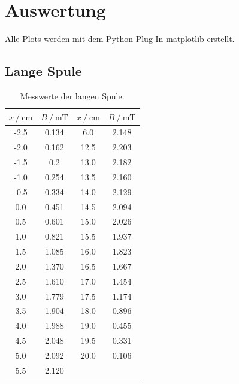 \section{Auswertung}
\label{sec:Auswertung}
Alle Plots werden mit dem Python Plug-In matplotlib \cite{matplotlib} erstellt.
\subsection{Lange Spule}

\FloatBarrier

\begin{table}
\centering
\caption{Messwerte der langen Spule.}
\begin{tabular}{cc|cc}
  \toprule
  $x \:/\: \si{\centi\meter}$ & $B \:/\: \si{\milli\tesla}$ & $x \:/\: \si{\centi\meter}$ & $B \:/\: \si{\milli\tesla}$ \\
  \midrule
  -2.5 & 0.134 &  6.0 & 2.148  \\
  -2.0 & 0.162 & 12.5 & 2.203 \\
  -1.5 & 0.2 &  13.0 & 2.182 \\
  -1.0 & 0.254 & 13.5 & 2.160 \\
  -0.5 & 0.334 &  14.0 & 2.129 \\ 
  0.0 & 0.451  & 14.5 & 2.094 \\
  0.5 & 0.601 & 15.0 & 2.026 \\
  1.0 & 0.821  & 15.5 & 1.937 \\
  1.5 & 1.085  & 16.0 & 1.823 \\
  2.0 & 1.370  & 16.5 & 1.667 \\
  2.5 & 1.610  &  17.0 & 1.454 \\
  3.0 & 1.779  & 17.5 & 1.174 \\
  3.5 & 1.904  & 18.0 & 0.896 \\
  4.0 & 1.988 & 19.0 & 0.455 \\
  4.5 & 2.048  &  19.5 & 0.331 \\
  5.0 & 2.092  & 20.0 & 0.106 \\
  5.5 & 2.120 & & \\
  \bottomrule
\end{tabular}
\label{tab:long}
\end{table}

